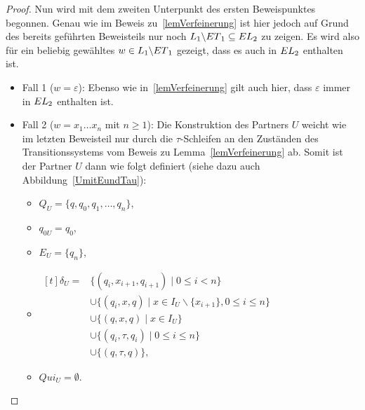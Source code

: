 \begin{proof}
  Nun wird mit dem zweiten Unterpunkt des ersten Beweispunktes begonnen. Genau
  wie im Beweis zu~\ref{lemVerfeinerung} ist hier jedoch auf Grund des bereits
  geführten Beweisteils nur noch $L_1\backslash ET{}_1\subseteq
  EL{}_2$ zu zeigen. Es wird also für ein beliebig gewähltes $w\in
  L_1\backslash ET{}_1$ gezeigt, dass es auch in $EL{}_2$ enthalten
  ist.
  \begin{itemize}
    \item Fall 1 ($w=\varepsilon$): Ebenso wie in~\ref{lemVerfeinerung} gilt
      auch hier, dass $\varepsilon$ immer in $EL{}_2$ enthalten ist.
    \item Fall 2 ($w=x_1\dots x_n$ mit $n\geq 1$): Die Konstruktion des
      Partners $U$ weicht wie im letzten Beweisteil nur durch die
      $\tau$-Schleifen an den Zuständen des Transitionssystems vom Beweis zu
      Lemma~\ref{lemVerfeinerung} ab. Somit ist der Partner $U$ dann wie folgt
      definiert (siehe dazu auch Abbildung~\ref{UmitEundTau}):
      \begin{itemize}
        \item $Q_U=\{q,q_0,q_1,\dots ,q_n\}$,
        \item $q_{0U}=q_0$,
        \item $E_U=\{q_n\}$,
        \item $\begin{aligned}[t]
            \delta _U=&\{(q_i,x_{i+1},q_{i+1})\mid 0\leq i< n\}\\
                      &\cup\{(q_i,x,q)\mid x\in I_U\backslash\{x_{i+1}\},0\leq
          i\leq n\}\\
          &\cup\{(q,x,q)\mid x\in I_U\}\\
          &\cup\{(q_i,\tau ,q_i)\mid 0\leq i\leq n\}\\
          &\cup\{(q,\tau ,q)\},
              \end{aligned}$
        \item $Qui_U =\emptyset$.
      \end{itemize}
      \begin{figure} [h!tbp]
      \begin{center}
\end{center}
\end{figure}
\end{itemize}
\end{proof}
